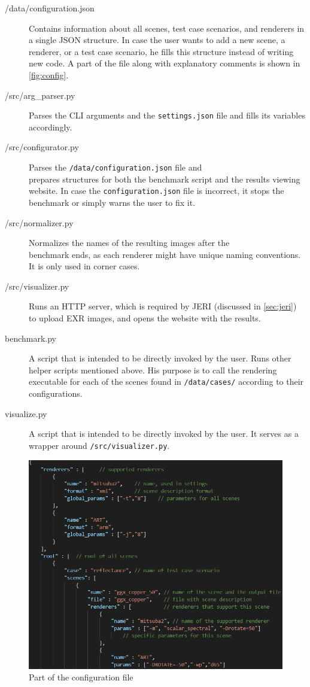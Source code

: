 \begin{description}
	\item[{/data/configuration.json}] Contains information about all scenes, test case scenarios, and renderers in a single JSON structure. In case the user wants to add a new scene, a renderer, or a test case scenario, he fills this structure instead of writing new code. A part of the file along with explanatory comments is shown in \autoref{fig:config}.
	\item[/src/arg\_parser.py] Parses the CLI arguments and the \texttt{settings.json} file and fills its variables accordingly.
	\item[/src/configurator.py] Parses the \texttt{/data/configuration.json} file and \\ prepares structures for both the benchmark script and the results viewing website. In case the \texttt{configuration.json} file is incorrect, it stops the benchmark or simply warns the user to fix it.
	\item[/src/normalizer.py] Normalizes the names of the resulting images after the \\benchmark ends, as each renderer might have unique naming conventions. It is only used in corner cases.
	\item[/src/visualizer.py] Runs an HTTP server, which is required by JERI (discussed in \autoref{sec:jeri}) to upload EXR images, and opens the website with the results.
	\item[benchmark.py] A script that is intended to be directly invoked by the user. Runs other helper scripts mentioned above. His purpose is to call the rendering executable for each of the scenes found in \texttt{/data/cases/} according to their configurations.
	\item[visualize.py] A script that is intended to be directly invoked by the user. It serves as a wrapper around \texttt{/src/visualizer.py}.
\end{description}

\begin{figure}
	\centering
	\includegraphics[width=\linewidth]{img/config.png}
	\caption{Part of the configuration file}
	\label{fig:config}
\end{figure}


